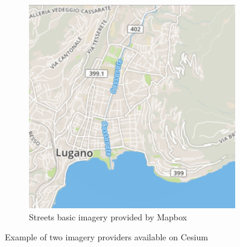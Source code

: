 \begin{itemize}
\begin{figure} [h]
\begin{subfigure}[b]{0.3\textwidth}
			\includegraphics[width=0.993\textwidth]{chapter2/images/Mapbox-Map}
			\caption{Streets basic imagery provided by Mapbox}
			\label{fig:Mapbox-Map}
		\end{subfigure}
		\caption{Example of two imagery providers available on Cesium}
		\label{fig:Bing_Mapbox-Map}
	\end{figure}


\end{itemize}
